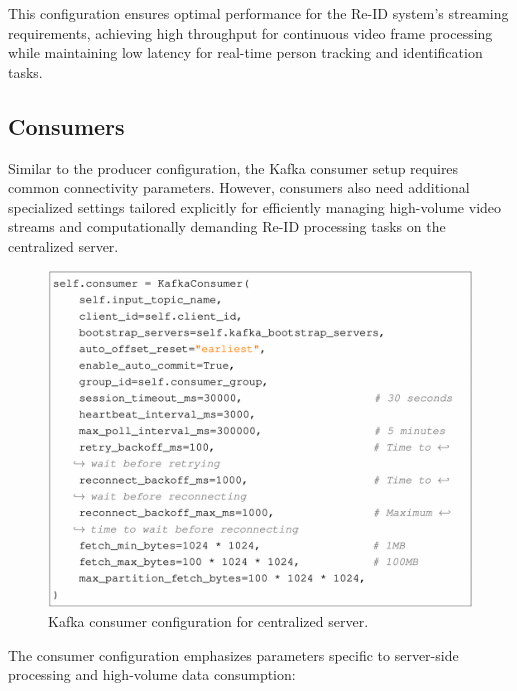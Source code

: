 This configuration ensures optimal performance for the Re-ID system's streaming requirements, achieving high throughput for continuous video frame processing while maintaining low latency for real-time person tracking and identification tasks.

\subsection{Consumers}

Similar to the producer configuration, the Kafka consumer setup requires common connectivity parameters. However, consumers also need additional specialized settings tailored explicitly for efficiently managing high-volume video streams and computationally demanding Re-ID processing tasks on the centralized server.

\begin{figure}[htbp]
    \centering
    \includegraphics[width=1\textwidth]{Figure/consumer_conf.png}
    \caption{Kafka consumer configuration for centralized server.}
    \label{fig:consumer_config}
\end{figure}

The consumer configuration emphasizes parameters specific to server-side processing and high-volume data consumption:

